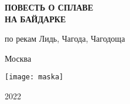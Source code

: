 \begin{titlepage}
	\newpage
	\begin{center}
		\Large \textbf \MyVarAuthorName
	\end{center}	
	\vspace{3cm}	
	\begin{center}
	\end{center}
	\begin{center}
		\LARGE\textbf{ПОВЕСТЬ О СПЛАВЕ\\НА БАЙДАРКЕ}
	\end{center}	
	\begin{center}
	\end{center}
	\begin{center}
		\Large {по рекам Лидь, Чагода, Чагодоща}
	\end{center}
	\begin{center}
	\end{center}
	\vspace{\fill}	
	\begin{center}\normalsize Москва\end{center}
	\vspace{-1.15cm}
	\begin{center}\texttt{[image: maska]}\end{center}
	\vspace{-1.32cm}
	\begin{center}\normalsize 2022\end{center}
\end{titlepage}
